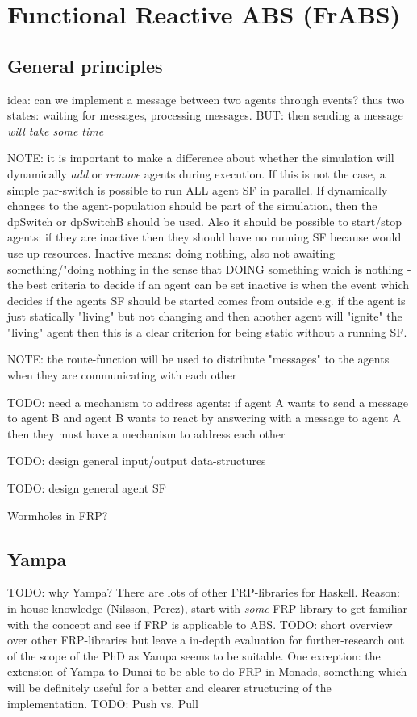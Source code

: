 \chapter{Functional Reactive ABS (FrABS)}
\label{chap:frABS}


\section{General principles}
idea: can we implement a message between two agents through events? thus two states: waiting for messages, processing messages. BUT: then sending a message \textit{will take some time}

NOTE: it is important to make a difference about whether the simulation will dynamically \textit{add} or \textit{remove} agents during execution. If this is not the case, a simple par-switch is possible to run ALL agent SF in parallel. If dynamically changes to the agent-population should be part of the simulation, then the dpSwitch or dpSwitchB should be used. Also it should be possible to start/stop agents: if they are inactive then they should have no running SF because would use up resources. Inactive means: doing nothing, also not awaiting something/"doing nothing in the sense that DOING something which is nothing - the best criteria to decide if an agent can be set inactive is when the event which decides if the agents SF should be started comes from outside e.g. if the agent is just statically "living" but not changing and then another agent will "ignite" the "living" agent then this is a clear criterion for being static without a running SF.

NOTE: the route-function will be used to distribute "messages" to the agents when they are communicating with each other 

TODO: need a mechanism to address agents: if agent A wants to send a message to agent B and agent B wants to react by answering with a message to agent A then they must have a mechanism to address each other 

TODO: design general input/output data-structures 

TODO: design general agent SF 

Wormholes in FRP? 

\section{Yampa}
TODO: why Yampa? There are lots of other FRP-libraries for Haskell. Reason: in-house knowledge (Nilsson, Perez), start with \textit{some} FRP-library to get familiar with the concept and see if FRP is applicable to ABS. TODO: short overview over other FRP-libraries but leave a in-depth evaluation for further-research out of the scope of the PhD as Yampa seems to be suitable. One exception: the extension of Yampa to Dunai to be able to do FRP in Monads, something which will be definitely useful for a better and clearer structuring of the implementation.
TODO: Push vs. Pull

